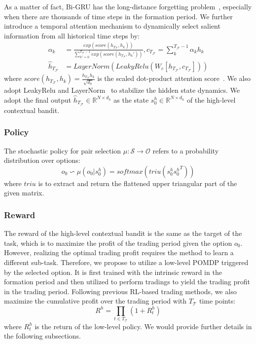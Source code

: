\documentclass[sigconf]{acmart}
\begin{document}
As a matter of fact, Bi-GRU has the long-distance forgetting problem~\cite{bahdanau2014neural}, especially when there are thousands of time steps in the formation period.
We further introduce a temporal attention mechanism to dynamically select salient information from all historical time steps by:
\begin{align}
 \alpha_k &= \frac{
 exp(score(h_{T_\mathcal{F}}, h_k))
 }{
 \sum_{k'=0}^{T_\mathcal{F}-1}
 exp(score(h_{T_\mathcal{F}}, h_k'))
 },
	c_{T_\mathcal{F}} = \sum_k^{T_\mathcal{F}-1} \alpha_k h_k \\
	\hat{h}_{T_\mathcal{F}} &= LayerNorm(LeakyRelu(W_c[h_{T_\mathcal{F}}, c_{T_\mathcal{F}}]))
\end{align}
where $score(h_{T_\mathcal{F}}, h_k) = \frac{h_{T_\mathcal{F}} h_k}{\sqrt{d_h}}$ is the scaled dot-product attention score~\cite{NIPS2017_3f5ee243}.
We also adopt LeakyRelu and LayerNorm~\cite{https://doi.org/10.48550/arxiv.1607.06450} to stabilize the hidden state dynamics.
We adopt the final output $\hat{h}_{T_\mathcal{F}} \in \mathbb{R}^{N \times d_h}$ as the state $s^h_0 \in \mathbb{R}^{N \times d_h}$ of the high-level contextual bandit.
	
\subsubsection{Policy}
The stochastic policy for pair selection $\mu: \mathcal{S} \rightarrow \mathcal{O}$ refers to a probability distribution over options:
\begin{equation}
 o_0 \backsim \mu(o_0|s^h_0) = softmax(triu(s^h_0 {s^h_0}^T))
\end{equation}
where $triu$ is to extract and return the flattened upper triangular part of the given matrix.
	
\subsubsection{Reward}
 The reward of the high-level contextual bandit is the same as the target of the task, which is to maximize the profit of the trading period given the option $o_0$.
 However, realizing the optimal trading profit requires the method to learn a different sub-task.
 Therefore, we propose to utilize a low-level POMDP triggered by the selected option.
 It is first trained with the intrinsic reward in the formation period and then utilized to perform tradings to yield the trading profit in the trading period.
 Following previous RL-based trading methods, we also maximize the cumulative profit over the trading period with $T_\mathcal{T}$ time points:
\begin{equation}
 R^h = \prod_{t \in T_\mathcal{T}} (1 + R^h_t)
\end{equation}
where $R^h_t$ is the return of the low-level policy.
We would provide further details in the following subsections.
	
\end{document}
